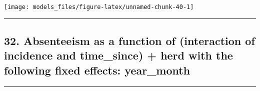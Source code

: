 \documentclass[]{article}
\begin{document}
\begin{center}\texttt{[image: models\_files/figure-latex/unnamed-chunk-40-1]} \end{center}

\newpage

\begin{center}\rule{0.5\linewidth}{\linethickness}\end{center}

\subsection{32. Absenteeism as a function of (interaction of incidence
and time\_since) + herd with the following fixed effects:
year\_month}\label{absenteeism-as-a-function-of-interaction-of-incidence-and-time_since-herd-with-the-following-fixed-effects-year_month}

\begin{center}\rule{0.5\linewidth}{\linethickness}\end{center}
\end{document}
